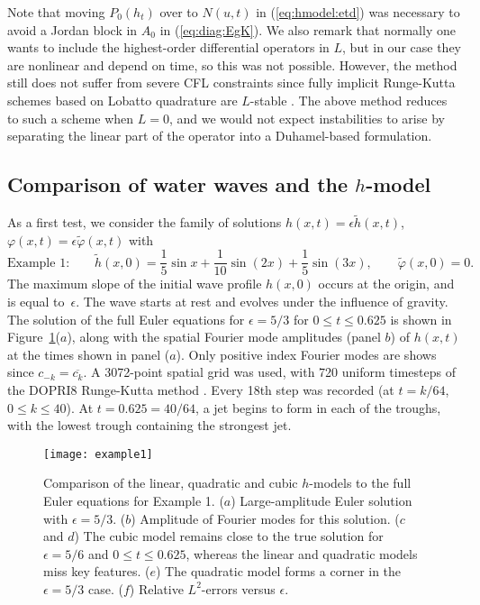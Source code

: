 \documentclass[11pt]{article}
\theoremstyle{plain}
\theoremstyle{definition}
\theoremstyle{definition}
\newcommand{\eps}{\epsilon}
\newcommand{\htil}{\widetilde{h}}
\newcommand{\phitil}{\widetilde{\varphi}}
\begin{document}
Note that moving $P_0(h_t)$ over to $N(u,t)$ in (\ref{eq:hmodel:etd})
was necessary to avoid a Jordan block in $A_0$ in (\ref{eq:diag:EgK}).
We also remark that normally one wants to include the highest-order
differential operators in $L$, but in our case they are nonlinear and
depend on time, so this was not possible. However, the method still
does not suffer from severe CFL constraints since fully implicit
Runge-Kutta schemes based on Lobatto quadrature are $L$-stable
\cite{hairer:I}. The above method reduces to such a scheme when $L=0$,
and we would not expect instabilities to arise by separating the
linear part of the operator into a Duhamel-based formulation.


\subsection{Comparison of water waves and the $h$-model}

As a first test, we consider the family of solutions $h(x,t)=\eps\htil(x,t)$,
$\varphi(x,t) = \eps \phitil(x,t)$ with
%
\begin{equation}
  \label{eq:ex1}
  \text{Example 1:} \qquad
  \htil(x,0) = \frac15\sin x + \frac1{10}\sin(2x) + \frac15\sin(3x), \qquad
  \phitil(x,0) = 0.
\end{equation}
%
The maximum slope of the initial wave profile $h(x,0)$ occurs at the
origin, and is equal to~$\eps$. The wave starts at rest and evolves
under the influence of gravity.  The solution of the full Euler
equations for $\eps=5/3$ for $0\le t\le 0.625$ is shown in
Figure~\ref{fig:ex1}($a$), along with the spatial Fourier mode
amplitudes (panel $b$) of $h(x,t)$ at the times shown in panel
($a$). Only positive index Fourier modes are shows since
$c_{-k}=\overline{c_k}$. A 3072-point spatial grid was used, with 720
uniform timesteps of the DOPRI8 Runge-Kutta method
\cite{hairer:I,dormand:81}.  Every 18th step was recorded (at $t=k/64$,
  $0\le k\le 40$).  At $t=0.625=40/64$, a jet begins to form in each
of the troughs, with the lowest trough containing the strongest jet.


\begin{figure}[p]
  \begin{center}
\texttt{[image: example1]}
\caption{\label{fig:ex1} Comparison of the linear, quadratic and cubic
  $h$-models to the full Euler equations for Example 1. ($a$)
  Large-amplitude Euler solution with $\eps=5/3$.  ($b$) Amplitude of
  Fourier modes for this solution. ($c$ and $d$) The cubic model
  remains close to the true solution for $\eps=5/6$ and $0\le
  t\le0.625$, whereas the linear and quadratic models miss key
  features. ($e$) The quadratic model forms a corner in the $\eps=5/3$
  case. ($f$) Relative $L^2$-errors versus $\eps$.}
\end{center}
\end{figure}
\end{document}
